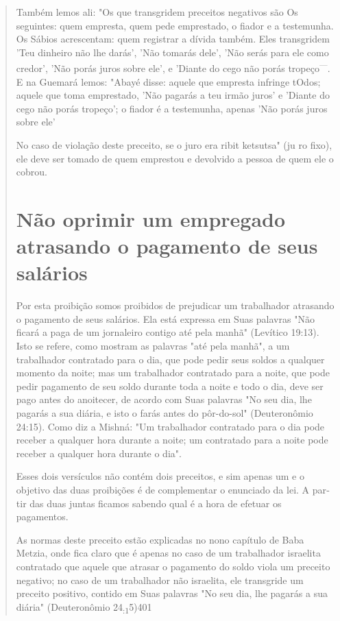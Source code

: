 \begin{quote}
Também lemos ali: "Os que transgridem preceitos negativos são Os
seguintes: quem empresta, quem pede emprestado, o fiador e a testemunha.
Os Sábios acrescentam: quem registrar a dívida também. Eles transgridem
'Teu dinheiro não lhe darás', 'Não tomarás dele', 'Não serás para ele
como credor', 'Não porás juros sobre ele', e 'Diante do cego não porás
tropeço\textsuperscript{---}. E na Gue­mará lemos: "Abayé disse: aquele
que empresta infringe tOdos; aquele que to­ma emprestado, 'Não pagarás a
teu irmão juros' e 'Diante do cego não porás tropeço'; o fiador é a
testemunha, apenas 'Não porás juros sobre ele'

No caso de violação deste preceito, se o juro era ribit ketsutsa" (ju ro
fixo), ele deve ser tomado de quem emprestou e devolvido a pessoa de
quem ele o cobrou.


\section{Não oprimir um empregado atrasando o pagamento de seus salários}

Por esta proibição somos proibidos de prejudicar um trabalhador
atra­sando o pagamento de seus salários. Ela está expressa em Suas
palavras "Não ficará a paga de um jornaleiro contigo até pela manhã"
(Levítico 19:13). Isto se refere, como mostram as palavras "até pela
manhã", a um trabalhador con­tratado para o dia, que pode pedir seus
soldos a qualquer momento da noite; mas um trabalhador contratado para a
noite, que pode pedir pagamento de seu soldo durante toda a noite e todo
o dia, deve ser pago antes do anoitecer, de acordo com Suas palavras "No
seu dia, lhe pagarás a sua diária, e isto o farás antes do pôr-do-sol"
(Deuteronômio 24:15). Como diz a Mishná: "Um traba­lhador contratado
para o dia pode receber a qualquer hora durante a noite; um contratado
para a noite pode receber a qualquer hora durante o dia".

Esses dois versículos não contém dois preceitos, e sim apenas um e o
objetivo das duas proibições é de complementar o enunciado da lei. A
par­tir das duas juntas ficamos sabendo qual é a hora de efetuar os
pagamentos.

As normas deste preceito estão explicadas no nono capítulo de Baba
Metzia, onde fica claro que é apenas no caso de um trabalhador israelita
contra­tado que aquele que atrasar o pagamento do soldo viola um
preceito negativo; no caso de um trabalhador não israelita, ele
transgride um preceito positivo, contido em Suas palavras "No seu dia,
lhe pagarás a sua diária" (Deuteronômio 24\textsubscript{:1}5)401


\end{quote}
